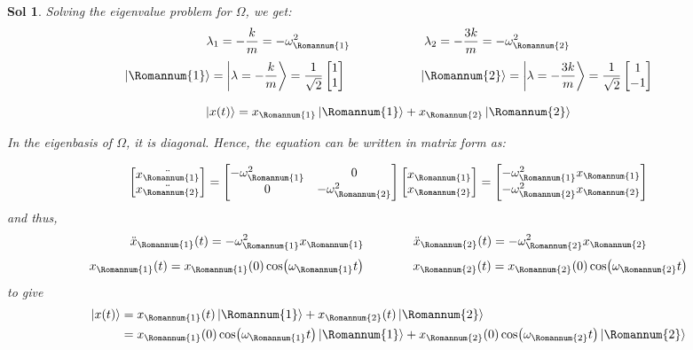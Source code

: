 \documentclass[12pt,a4paper]{report}
\newcommand{\rom}[1]{\Romannum{#1}}
\newtheorem*{solution}{Sol}
\begin{document}
\begin{solution}
    Solving the eigenvalue problem for $\Omega$, we get:
    \begin{equation*}
        \lambda_1 = -\frac{k}{m} = -\omega_{\rom{1}}^2 \qquad\qquad\qquad 
        \lambda_2 = -\frac{3k}{m} = -\omega_{\rom{2}}^2
    \end{equation*}
    \begin{equation*}
        \ket{\rom{1}} = \ket{\lambda = -\frac{k}{m}} = \frac{1}{\sqrt{2}} \begin{bmatrix}
            1 \\
            1
        \end{bmatrix}
        \qquad\qquad\qquad
        \ket{\rom{2}} = \ket{\lambda = -\frac{3k}{m}} = \frac{1}{\sqrt{2}} \begin{bmatrix}
            1 \\
            -1
        \end{bmatrix}
    \end{equation*}

    \begin{equation*}
        \ket{x(t)} = x_\rom{1}\ket{\rom{1}} + x_\rom{2}\ket{\rom{2}}
    \end{equation*}

    In the eigenbasis of $\Omega$, it is diagonal. Hence, the equation can be written in matrix form as:

    \begin{equation*}
        \begin{bmatrix}
            \ddot{x_\rom{1}} \\
            \ddot{x_\rom{2}}
        \end{bmatrix}
        =
        \begin{bmatrix}
            -\omega_\rom{1}^2 & 0 \\
            0 & -\omega_\rom{2}^2
        \end{bmatrix}
        \begin{bmatrix}
            x_\rom{1} \\
            x_\rom{2}
        \end{bmatrix}
        =
        \begin{bmatrix}
            -\omega_\rom{1}^2x_\rom{1} \\
            -\omega_\rom{2}^2x_\rom{2}
        \end{bmatrix}
    \end{equation*}
    and thus,
    \begin{equation*}
        \ddot{x}_\rom{1}(t) = -\omega_\rom{1}^2x_\rom{1} \qquad\qquad \ddot{x}_\rom{2}(t) = -\omega_\rom{2}^2x_\rom{2}
    \end{equation*}
    \begin{equation*}
        x_\rom{1}(t) = x_\rom{1}(0)\cos(\omega_\rom{1}t) \qquad\qquad x_\rom{2}(t) = x_\rom{2}(0)\cos(\omega_\rom{2}t)
    \end{equation*}
    to give
    \begin{align*}
        \ket{x(t)} &= x_\rom{1}(t) \ket{\rom{1}} + x_\rom{2}(t) \ket{\rom{2}} \\
        &= x_\rom{1}(0)\cos(\omega_\rom{1}t) \ket{\rom{1}} + x_\rom{2}(0)\cos(\omega_\rom{2}t) \ket{\rom{2}}
    \end{align*}


\end{solution}
\end{document}
